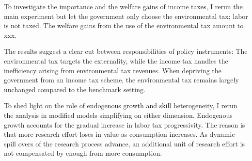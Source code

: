 To investigate the importance and the welfare gains of income taxes, I rerun the main experiment but let the government only choose the environmental tax; labor is not taxed. The welfare gains from the use of the environmental tax amount to xxx. \textit{}

The results suggest a clear cut between responsibilities of policy instruments: The environmental tax targets the externality, while the income tax handles the inefficiency arising from environmental tax revenues. When depriving the government from an income tax scheme, the environmental tax remains largely unchanged compared to the benchmark setting. 

To shed light on the role of endogenous growth and skill heterogeneity, I rerun the analysis in modified models simplifying on either dimension. 
Endogenous growth accounts for the gradual increase in labor tax progressivity. 
The reason is that more research effort loses in value as consumption increases. As dynamic spill overs of the research process advance, an additional unit of research effort is not compensated by enough from more consumption. 


